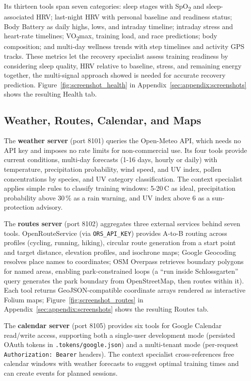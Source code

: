 Its thirteen tools span seven categories: sleep stages with SpO\textsubscript{2} and sleep-associated HRV; last-night HRV with personal baseline and readiness status; Body Battery as daily highs, lows, and intraday timeline; intraday stress and heart-rate timelines; VO\textsubscript{2}max, training load, and race predictions; body composition; and multi-day wellness trends with step timelines and activity GPS tracks. These metrics let the recovery specialist assess training readiness by considering sleep quality, HRV relative to baseline, stress, and remaining energy together, the multi-signal approach \cite{rothschild_predicting_2024} showed is needed for accurate recovery prediction. Figure~\ref{fig:screenshot_health} in Appendix~\ref{sec:appendix:screenshots} shows the resulting Health tab.

\subsection{Weather, Routes, Calendar, and Maps}\label{sec:data:other}

The \textbf{weather server} (port 8101) queries the Open-Meteo API, which needs no API key and imposes no rate limits for non-commercial use. Its four tools provide current conditions, multi-day forecasts (1-16 days, hourly or daily) with temperature, precipitation probability, wind speed, and UV index, pollen concentrations by species, and UV category classification. The context specialist applies simple rules to classify training windows: 5-20\,\textdegree C as ideal, precipitation probability above 30\,\% as a rain warning, and UV index above 6 as a sun-protection advisory.

The \textbf{routes server} (port 8102) aggregates three external services behind seven tools. OpenRouteService (via \texttt{ORS\_API\_KEY}) provides A-to-B routing across profiles (cycling, running, hiking), circular route generation from a start point and target distance, elevation profiles, and isochrone maps; Google Geocoding resolves place names to coordinates; OSM Overpass retrieves boundary polygons for named areas, enabling park-constrained loops (a ``run inside Schlossgarten'' query generates the park boundary from OpenStreetMap, then routes within it). Each tool returns GeoJSON-compatible coordinate arrays rendered as interactive Folium maps; Figure~\ref{fig:screenshot_routes} in Appendix~\ref{sec:appendix:screenshots} shows the resulting Routes tab.

The \textbf{calendar server} (port 8105) provides six tools for Google Calendar read/write access, supporting both a single-user development mode (persisted OAuth tokens in \texttt{.tokens/google.json}) and a multi-tenant mode (per-request \texttt{Authorization: Bearer} headers). The context specialist cross-references free calendar windows with weather forecasts to suggest optimal training times and can create events for planned sessions.

